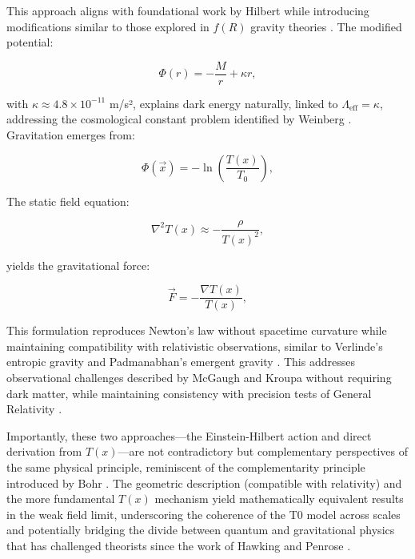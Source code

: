 \documentclass[twocolumn,aps,prl]{revtex4-2}
\begin{document}
	This approach aligns with foundational work by Hilbert \cite{Hilbert1924} while introducing modifications similar to those explored in $f(R)$ gravity theories \cite{Sotiriou2010, DeFelice2010}. The modified potential:
	
	\begin{equation}
		\Phi(r) = -\frac{M}{r} + \kappa r, \label{eq:mod_potential}
	\end{equation}
	
	with $\kappa \approx 4.8 \times 10^{-11}$ m/s², explains dark energy naturally, linked to $\Lambda_{\text{eff}} = \kappa$, addressing the cosmological constant problem identified by Weinberg \cite{Weinberg1989}. Gravitation emerges from:
	
	\begin{equation}
		\Phi(\vec{x}) = -\ln\left(\frac{T(x)}{T_0}\right), \label{eq:phi_from_t}
	\end{equation}
	
	The static field equation:
	
	\begin{equation}
		\nabla^2 T(x) \approx -\frac{\rho}{T(x)^2}, \label{eq:static_field}
	\end{equation}
	
	yields the gravitational force:
	
	\begin{equation}
		\vec{F} = -\frac{\nabla T(x)}{T(x)}, \label{eq:grav_force}
	\end{equation}
	
	This formulation reproduces Newton's law without spacetime curvature while maintaining compatibility with relativistic observations, similar to Verlinde's entropic gravity \cite{Verlinde2011} and Padmanabhan's emergent gravity \cite{Padmanabhan2012}. This addresses observational challenges described by McGaugh \cite{McGaugh2011} and Kroupa \cite{Kroupa2012} without requiring dark matter, while maintaining consistency with precision tests of General Relativity \cite{Will2014}.
	
	Importantly, these two approaches—the Einstein-Hilbert action and direct derivation from $T(x)$—are not contradictory but complementary perspectives of the same physical principle, reminiscent of the complementarity principle introduced by Bohr \cite{Bohr1928}. The geometric description (compatible with relativity) and the more fundamental $T(x)$ mechanism yield mathematically equivalent results in the weak field limit, underscoring the coherence of the T0 model across scales and potentially bridging the divide between quantum and gravitational physics that has challenged theorists since the work of Hawking \cite{Hawking1975} and Penrose \cite{Penrose1965}.
	
\end{document}
